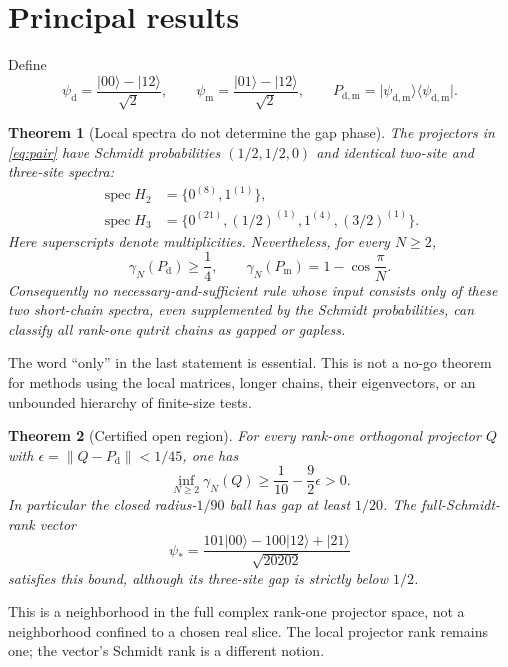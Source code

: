 \documentclass[11pt,a4paper]{article}
\newtheorem{theorem}{Theorem}[section]
\theoremstyle{remark}\newtheorem{remark}[theorem]{Remark}
\newcommand{\ket}[1]{\lvert #1\rangle}
\newcommand{\bra}[1]{\langle #1\rvert}
\newcommand{\norm}[1]{\left\lVert #1\right\rVert}
\newcommand{\spec}{\operatorname{spec}}
\newcommand{\Pd}{P_{\mathrm d}}
\newcommand{\Pm}{P_{\mathrm m}}
\begin{document}
\section{Principal results}
Define
\begin{equation}\label{eq:pair}
 \psi_{\mathrm d}=\frac{\ket{00}-\ket{12}}{\sqrt2},\qquad
 \psi_{\mathrm m}=\frac{\ket{01}-\ket{12}}{\sqrt2},\qquad
 P_{\mathrm d,\mathrm m}=\ket{\psi_{\mathrm d,\mathrm m}}\bra{\psi_{\mathrm d,\mathrm m}}.
\end{equation}
\begin{theorem}[Local spectra do not determine the gap phase]\label{thm:main}
The projectors in \eqref{eq:pair} have Schmidt probabilities $(1/2,1/2,0)$ and identical two-site and three-site spectra:
\begin{align}
 \spec H_2&=\{0^{(8)},1^{(1)}\},\label{eq:h2spec}\\
 \spec H_3&=\{0^{(21)},(1/2)^{(1)},1^{(4)},(3/2)^{(1)}\}.\label{eq:h3spec}
\end{align}
Here superscripts denote multiplicities. Nevertheless, for every $N\ge2$,
\begin{equation}\label{eq:mainbounds}
 \gamma_N(\Pd)\ge\frac14,
 \qquad
 \gamma_N(\Pm)=1-\cos\frac\pi N.
\end{equation}
Consequently no necessary-and-sufficient rule whose input consists only of these two short-chain spectra, even supplemented by the Schmidt probabilities, can classify all rank-one qutrit chains as gapped or gapless.
\end{theorem}
The word ``only'' in the last statement is essential. This is not a no-go theorem for methods using the local matrices, longer chains, their eigenvectors, or an unbounded hierarchy of finite-size tests.

\begin{theorem}[Certified open region]\label{thm:ball}
For every rank-one orthogonal projector $Q$ with
$\epsilon=\norm{Q-\Pd}<1/45$, one has
\begin{equation}\label{eq:ball}
 \inf_{N\ge2}\gamma_N(Q)\ge\frac1{10}-\frac92\epsilon>0.
\end{equation}
In particular the closed radius-$1/90$ ball has gap at least $1/20$.
The full-Schmidt-rank vector
\begin{equation}\label{eq:star}
 \psi_* =\frac{101\ket{00}-100\ket{12}+\ket{21}}{\sqrt{20202}}
\end{equation}
satisfies this bound, although its three-site gap is strictly below $1/2$.
\end{theorem}
This is a neighborhood in the full complex rank-one projector space, not a neighborhood confined to a chosen real slice. The local projector rank remains one; the vector's Schmidt rank is a different notion.
\end{document}
